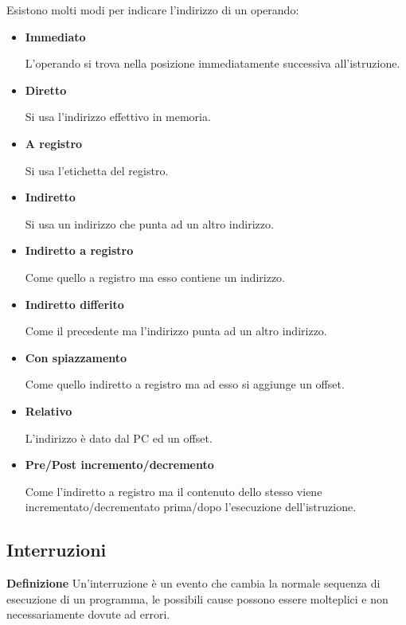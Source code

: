 \documentclass{article}
\begin{document}
\noindent Esistono molti modi per indicare l'indirizzo di un operando: 
\begin{itemize}
    \item \textbf{Immediato}

        L'operando si trova nella posizione immediatamente successiva all'istruzione.

    \item \textbf{Diretto}

        Si usa l'indirizzo effettivo in memoria.   

    \item \textbf{A registro}

        Si usa l'etichetta del registro.

    \item \textbf{Indiretto}

        Si usa un indirizzo che punta ad un altro indirizzo.

    \item \textbf{Indiretto a registro}

        Come quello a registro ma esso contiene un indirizzo.

    \item \textbf{Indiretto differito}

        Come il precedente ma l'indirizzo punta ad un altro indirizzo.

    \item \textbf{Con spiazzamento}

        Come quello indiretto a registro ma ad esso si aggiunge un offset.

    \item \textbf{Relativo}

        L'indirizzo è dato dal PC ed un offset.

    \item \textbf{Pre/Post incremento/decremento}

        Come l'indiretto a registro ma il contenuto dello stesso viene incrementato/decrementato prima/dopo l'esecuzione dell'istruzione.
    
\end{itemize}

\subsection{Interruzioni}

\textbf{Definizione} Un'interruzione è un evento che cambia la normale sequenza di esecuzione di un programma, le possibili cause possono essere molteplici e non necessariamente dovute ad errori.\newline
\end{document}

